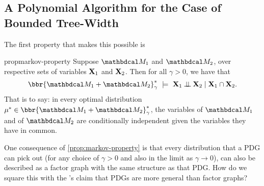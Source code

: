 \documentclass[twoside]{article}
\begin{document}


\subsection{A Polynomial Algorithm for the Case of Bounded Tree-Width}
The first property that makes this possible is 

\begin{linked}{prop}{markov-property}
	Suppose $\dg M_1$ and $\dg M_2$, over respective sets of variables $\mathbf{X}_1$ and $\mathbf{X}_2$.
	Then for all $\gamma > 0$, we have that
	\[
	 	\bbr{\dg M_1 \bundle \dg M_2}^*_\gamma
			~\models~
		\mat X_1 \mathbin{\bot\!\!\!\bot} \mat X_2 \mid \mat X_1 \cap \mat X_2.
	\]
	That is to say: in every optimal distribution $\mu^* \in \bbr{\dg M_1 \bundle \dg M_2}^*_\gamma$,
    the variables of $\dg M_1$ and of $\dg M_2$ are conditionally independent given the variables they have in common.
\end{linked}

One consequence of \cref{prop:markov-property} is that every distribution that a PDG
can pick out (for any choice of $\gamma > 0$ and also in the limit as $\gamma \to 0$), can also be described as a factor graph with the same structure as that PDG.
How do we square this with the \citeauthor{pdg-aaai}'s claim that PDGs are more general than factor graphs?
\end{document}
